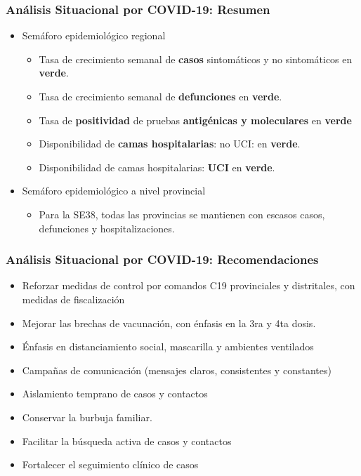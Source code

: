 \documentclass[xcolor=table]{beamer}
\begin{document}
\begin{frame}
	\frametitle{Análisis Situacional por COVID-19: Resumen}
	\vspace{-.5cm}
	\begin{itemize}
		\item Semáforo epidemiológico regional
		\begin{itemize}
			\item Tasa de crecimiento semanal de \textbf{\color{mycolor4}casos} sintomáticos y no sintomáticos en \textbf{\color{mycolor3}verde}.
			\item Tasa de crecimiento semanal de \textbf{\color{mycolor4}defunciones} en \textbf{\color{mycolor3}verde}.
			\item Tasa de \textbf{\color{mycolor4}positividad} de pruebas \textbf{\color{mycolor4}antigénicas y moleculares} en \textbf{\color{mycolor3}verde} 
			\item Disponibilidad de \textbf{\color{mycolor4}camas hospitalarias}: no UCI: en \textbf{\color{mycolor3}verde}.
			\item Disponibilidad de camas hospitalarias: \textbf{\color{mycolor4}UCI} en \textbf{\color{mycolor3}verde}.
		\end{itemize} 
		\item Semáforo epidemiológico a nivel provincial
		\begin{itemize}
			\item Para la SE38, todas las provincias se mantienen con escasos casos, defunciones y hospitalizaciones.
		\end{itemize}
	\end{itemize}
\end{frame}

\begin{frame}[label=recomendaciones]
	\frametitle{Análisis Situacional por COVID-19: Recomendaciones}
	\vspace{-.5cm}
	\begin{itemize}
			\item Reforzar medidas de control por comandos C19 provinciales y distritales, con medidas de fiscalización
			\item Mejorar las brechas de vacunación, con énfasis en la 3ra y 4ta dosis.
			\item Énfasis en distanciamiento social, mascarilla y ambientes ventilados
			\item Campañas de comunicación (mensajes claros, consistentes y constantes)
			\item Aislamiento temprano de casos y contactos
			\item Conservar la burbuja familiar. 
			\item Facilitar la búsqueda activa de casos y contactos
			\item Fortalecer el seguimiento clínico de casos			
	\end{itemize} 
\end{frame}
\end{document}
